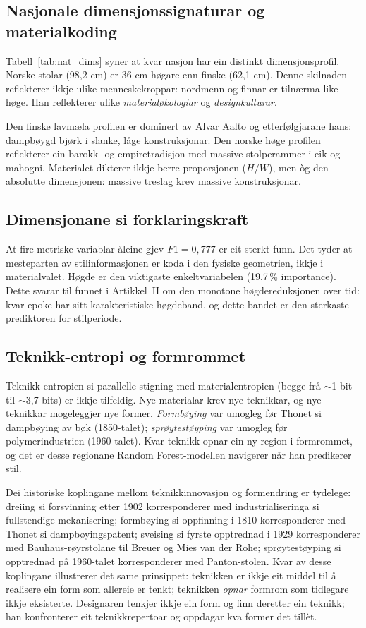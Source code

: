 \documentclass[10pt, a4paper, twocolumn]{article}
\begin{document}
\subsection{Nasjonale dimensjonssignaturar og materialkoding}

Tabell~\ref{tab:nat_dims} syner at kvar nasjon har ein distinkt dimensjonsprofil. Norske stolar (98,2 cm) er 36 cm høgare enn finske (62,1 cm). Denne skilnaden reflekterer ikkje ulike menneskekroppar: nordmenn og finnar er tilnærma like høge. Han reflekterer ulike \emph{materialøkologiar} og \emph{designkulturar}.

Den finske lavmæla profilen er dominert av Alvar Aalto og etterfølgjarane hans: dampbøygd bjørk i slanke, låge konstruksjonar. Den norske høge profilen reflekterer ein barokk- og empiretradisjon med massive stolperammer i eik og mahogni. Materialet dikterer ikkje berre proporsjonen ($H/W$), men òg den absolutte dimensjonen: massive treslag krev massive konstruksjonar.

\subsection{Dimensjonane si forklaringskraft}

At fire metriske variablar åleine gjev $F1 = 0{,}777$ er eit sterkt funn. Det tyder at mesteparten av stilinformasjonen er koda i den fysiske geometrien, ikkje i materialvalet. Høgde er den viktigaste enkeltvariabelen (19,7\,\% importance). Dette svarar til funnet i Artikkel~II om den monotone høgdereduksjonen over tid: kvar epoke har sitt karakteristiske høgdeband, og dette bandet er den sterkaste prediktoren for stilperiode.

\subsection{Teknikk-entropi og formrommet}

Teknikk-entropien si parallelle stigning med materialentropien (begge frå $\sim$1 bit til $\sim$3,7 bits) er ikkje tilfeldig. Nye materialar krev nye teknikkar, og nye teknikkar mogeleggjer nye former. \emph{Formbøying} var umogleg før Thonet si dampbøying av bøk (1850-talet); \emph{sprøytestøyping} var umogleg før polymerindustrien (1960-talet). Kvar teknikk opnar ein ny region i formrommet, og det er desse regionane Random Forest-modellen navigerer når han predikerer stil.

Dei historiske koplingane mellom teknikkinnovasjon og formendring er tydelege: dreiing si forsvinning etter 1902 korresponderer med industrialiseringa si fullstendige mekanisering; formbøying si oppfinning i 1810 korresponderer med Thonet si dampbøyingspatent; sveising si fyrste opptrednad i 1929 korresponderer med Bauhaus-røyrstolane til Breuer og Mies van der Rohe; sprøytestøyping si opptrednad på 1960-talet korresponderer med Panton-stolen. Kvar av desse koplingane illustrerer det same prinsippet: teknikken er ikkje eit middel til å realisere ein form som allereie er tenkt; teknikken \emph{opnar} formrom som tidlegare ikkje eksisterte. Designaren tenkjer ikkje ein form og finn deretter ein teknikk; han konfronterer eit teknikkrepertoar og oppdagar kva former det tillèt.
\end{document}
